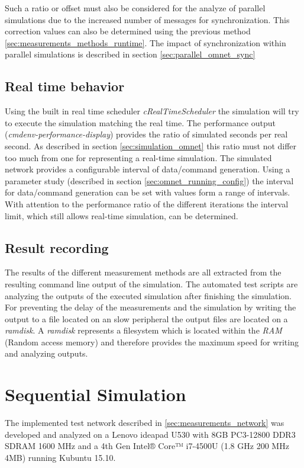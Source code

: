 Such a ratio or offset must also be considered for the analyze of parallel simulations due to the increased number of messages for synchronization.
This correction values can also be determined using the previous method \ref{sec:measurements_methods_runtime}.
The impact of synchronization within parallel simulations is described in section \ref{sec:parallel_omnet_sync}

\subsection{Real time behavior}
\label{sec:measurements_methods_realtime}
Using the built in real time scheduler \emph{cRealTimeScheduler} the simulation will try to execute the simulation matching the real time.
The performance output (\emph{cmdenv-performance-display}) provides the ratio of simulated seconds per real second.
As described in section \ref{sec:simulation_omnet} this ratio must not differ too much from one for representing a real-time simulation.
The simulated network provides a configurable interval of data/command generation.
Using a parameter study (described in section \ref{sec:omnet_running_config}) the interval for data/command generation can be set with values form a range of intervals.
With attention to the performance ratio of the different iterations the interval limit, which still allows real-time simulation, can be determined.

\subsection{Result recording}
The results of the different measurement methods are all extracted from the resulting command line output of the simulation.
The automated test scripts are analyzing the outputs of the executed simulation after finishing the simulation.
For preventing the delay of the measurements and the simulation by writing the output to a file located on an slow peripheral the output files are located on a \emph{ramdisk}.
A \emph{ramdisk} represents a filesystem which is located within the \emph{RAM} (Random access memory) and therefore provides the maximum speed for writing and analyzing outputs.

\section{Sequential Simulation}
\label{sec:measurements_sequential}
The implemented test network described in \ref{sec:measurements_network} was developed and analyzed on a Lenovo ideapad U530 with 8GB PC3-12800 DDR3 SDRAM 1600 MHz and a 4th Gen Intel® Core™ i7-4500U (1.8 GHz 200 MHz 4MB) running Kubuntu 15.10.
\cite{lenovo_spec}

